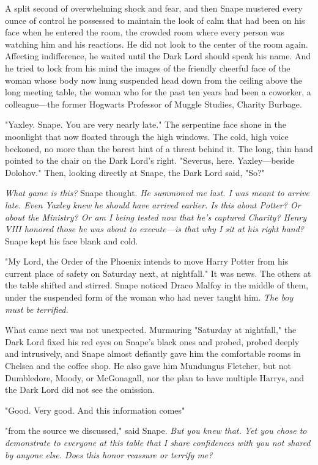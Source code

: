 A split second of overwhelming shock and fear, and then Snape mustered every ounce of control he possessed to maintain the look of calm that had been on his face when he entered the room, the crowded room where every person was watching him and his reactions. He did not look to the center of the room again. Affecting indifference, he waited until the Dark Lord should speak his name. And he tried to lock from his mind the images of the friendly cheerful face of the woman whose body now hung suspended head down from the ceiling above the long meeting table, the woman who for the past ten years had been a coworker, a colleague—the former Hogwarts Professor of Muggle Studies, Charity Burbage.

"Yaxley. Snape. You are very nearly late." The serpentine face shone in the moonlight that now floated through the high windows. The cold, high voice beckoned, no more than the barest hint of a threat behind it. The long, thin hand pointed to the chair on the Dark Lord's right. "Severus, here. Yaxley—beside Dolohov." Then, looking directly at Snape, the Dark Lord said, "So?"

\emph{What game is this?} Snape thought. \emph{He summoned me last. I was meant to arrive late. Even Yaxley knew he should have arrived earlier. Is this about Potter? Or about the Ministry? Or am I being tested now that he's captured Charity? Henry VIII honored those he was about to execute—is that why I sit at his right hand?} Snape kept his face blank and cold.

"My Lord, the Order of the Phoenix intends to move Harry Potter from his current place of safety on Saturday next, at nightfall." It was news. The others at the table shifted and stirred. Snape noticed Draco Malfoy in the middle of them, under the suspended form of the woman who had never taught him. \emph{The boy must be terrified.}

What came next was not unexpected. Murmuring "Saturday{\el} at nightfall," the Dark Lord fixed his red eyes on Snape's black ones and probed, probed deeply and intrusively, and Snape almost defiantly gave him the comfortable rooms in Chelsea and the coffee shop. He also gave him Mundungus Fletcher, but not Dumbledore, Moody, or McGonagall, nor the plan to have multiple Harrys, and the Dark Lord did not see the omission.

"Good. Very good. And this information comes{\el}"

"{\el}from the source we discussed," said Snape. \emph{But you knew that. Yet you chose to demonstrate to everyone at this table that I share confidences with you not shared by anyone else. Does this honor reassure or terrify me?}

